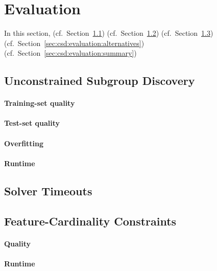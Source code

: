 \documentclass{article}
\theoremstyle{definition}
\begin{document}
\section{Evaluation}
\label{sec:csd:evaluation}

In this section, (cf.~Section~\ref{sec:csd:evaluation:unconstrained}) (cf.~Section~\ref{sec:csd:evaluation:timeouts}) (cf.~Section~\ref{sec:csd:evaluation:cardinality}) (cf.~Section~\ref{sec:csd:evaluation:alternatives}) (cf.~Section~\ref{sec:csd:evaluation:summary})

\subsection{Unconstrained Subgroup Discovery}
\label{sec:csd:evaluation:unconstrained}

\paragraph{Training-set quality}

\paragraph{Test-set quality}

\paragraph{Overfitting}

\paragraph{Runtime}

\subsection{Solver Timeouts}
\label{sec:csd:evaluation:timeouts}

\subsection{Feature-Cardinality Constraints}
\label{sec:csd:evaluation:cardinality}

\paragraph{Quality}

\paragraph{Runtime}
\end{document}
